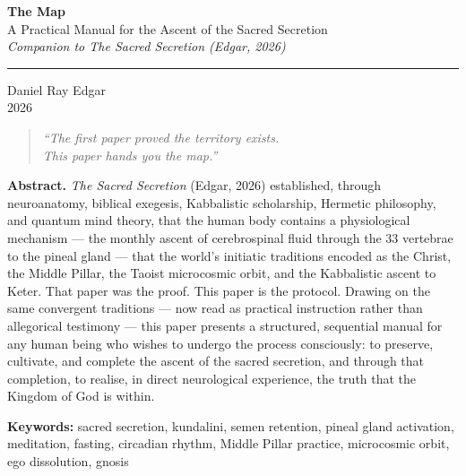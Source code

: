\documentclass[12pt, a4paper]{article}
\begin{document}

\begin{titlepage}
  \centering
  \vspace*{2cm}

  {\LARGE\bfseries The Map}\\[0.8em]
  {\large A Practical Manual for the Ascent of the Sacred Secretion}\\[0.4em]
  {\normalsize\itshape Companion to \emph{The Sacred Secretion} (Edgar, 2026)}

  \vspace{2cm}
  \rule{0.5\linewidth}{0.5pt}
  \vspace{2cm}

  {\large Daniel Ray Edgar}\\[0.4em]
  {\normalsize 2026}

  \vfill

  \begin{quote}
    \itshape\centering
    ``The first paper proved the territory exists.\\
    This paper hands you the map.''
  \end{quote}

  \vspace{1cm}
  \noindent\textbf{Abstract.}\quad
  \emph{The Sacred Secretion} (Edgar, 2026) established, through neuroanatomy,
  biblical exegesis, Kabbalistic scholarship, Hermetic philosophy, and quantum
  mind theory, that the human body contains a physiological mechanism — the
  monthly ascent of cerebrospinal fluid through the 33 vertebrae to the pineal
  gland — that the world's initiatic traditions encoded as the Christ, the
  Middle Pillar, the Taoist microcosmic orbit, and the Kabbalistic ascent to
  Keter. That paper was the proof. This paper is the protocol. Drawing on the
  same convergent traditions — now read as practical instruction rather than
  allegorical testimony — this paper presents a structured, sequential manual
  for any human being who wishes to undergo the process consciously: to
  preserve, cultivate, and complete the ascent of the sacred secretion, and
  through that completion, to realise, in direct neurological experience, the
  truth that the Kingdom of God is within.

  \vspace{0.5cm}
  \noindent\textbf{Keywords:} sacred secretion, kundalini, semen retention,
  pineal gland activation, meditation, fasting, circadian rhythm,
  Middle Pillar practice, microcosmic orbit, ego dissolution, gnosis

\end{titlepage}
\end{document}
